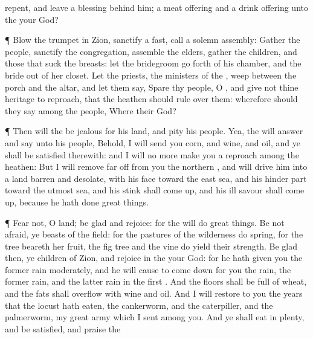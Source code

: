 {repent, and
leave a
blessing
behind him;
{} a meat
offering and a drink
offering unto the
{} your
God?
\par }{\PP {}¶
Blow the
trumpet in
Zion,
sanctify a
fast,
call a solemn
assembly:
Gather the
people,
sanctify the
congregation,
assemble the
elders,
gather the
children, and those that
suck the
breasts: let the
bridegroom go
forth of his
chamber, and the
bride out of her
closet.
Let the
priests, the
ministers of the
{},
weep between the
porch and the
altar, and let them
say,
Spare thy
people, O
{}, and
give not thine
heritage to
reproach, that the
heathen should rule
over them: wherefore should they
say among the
people, Where
{} their
God?
\par }{\PP {}¶ Then will the
{} be
jealous for his
land, and
pity his
people.
Yea, the
{} will
answer and
say unto his
people, Behold, I will
send you
corn, and
wine, and
oil, and ye shall be
satisfied therewith: and I will no more
make you a
reproach among the
heathen:
But I will remove far
off from you the
northern
{}, and will
drive him into a
land
barren and
desolate, with his
face toward the
east
sea, and his hinder
part toward the
utmost
sea, and his
stink shall come
up, and his ill
savour shall come
up, because he hath
done great
things.
\par }{\PP {}¶
Fear not, O
land; be
glad and
rejoice: for the
{} will
do great
things.
Be not
afraid, ye
beasts of the
field: for the
pastures of the
wilderness do
spring, for the
tree
beareth her
fruit, the fig
tree and the
vine do
yield their
strength.
Be
glad then, ye
children of
Zion, and
rejoice in the
{} your
God: for he hath
given you the former
rain
moderately, and he will cause to come
down for you the
rain, the former
rain, and the latter
rain in the
first
{}.
And the
floors shall be
full of
wheat, and the
fats shall
overflow with
wine and
oil.
And I will
restore to you the
years that the
locust hath
eaten, the
cankerworm, and the
caterpiller, and the
palmerworm, my
great
army which I
sent among you.
And ye shall
eat in
plenty, and be
satisfied, and
praise the
}
